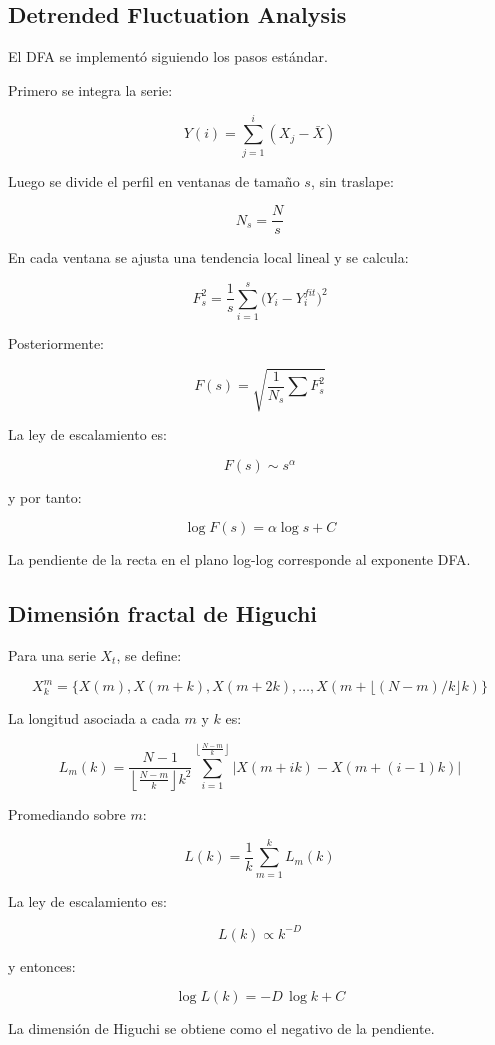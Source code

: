 \documentclass[12pt,a4paper]{article}
\begin{document}
\subsection{Detrended Fluctuation Analysis}

El DFA se implementó siguiendo los pasos estándar.

Primero se integra la serie:

\[
Y(i)=\sum_{j=1}^{i}(X_j-\bar X)
\]

Luego se divide el perfil en ventanas de tamaño \(s\), sin traslape:

\[
N_s = \frac{N}{s}
\]

En cada ventana se ajusta una tendencia local lineal y se calcula:

\[
F_s^2=\frac{1}{s}\sum_{i=1}^{s}\bigl(Y_i-Y_i^{fit}\bigr)^2
\]

Posteriormente:

\[
F(s)=\sqrt{\frac{1}{N_s}\sum F_s^2}
\]

La ley de escalamiento es:

\[
F(s)\sim s^\alpha
\]

y por tanto:

\[
\log F(s)=\alpha \log s + C
\]

La pendiente de la recta en el plano log-log corresponde al exponente DFA.

\subsection{Dimensión fractal de Higuchi}

Para una serie \(X_t\), se define:

\[
X_k^m=\{X(m),X(m+k),X(m+2k),\dots,X(m+\lfloor (N-m)/k \rfloor k)\}
\]

La longitud asociada a cada \(m\) y \(k\) es:

\[
L_m(k)=
\frac{N-1}{\left\lfloor \frac{N-m}{k}\right\rfloor k^2}
\sum_{i=1}^{\left\lfloor \frac{N-m}{k}\right\rfloor}
\left|X(m+ik)-X(m+(i-1)k)\right|
\]

Promediando sobre \(m\):

\[
L(k)=\frac{1}{k}\sum_{m=1}^{k}L_m(k)
\]

La ley de escalamiento es:

\[
L(k)\propto k^{-D}
\]

y entonces:

\[
\log L(k)= -D\,\log k + C
\]

La dimensión de Higuchi se obtiene como el negativo de la pendiente.
\end{document}

